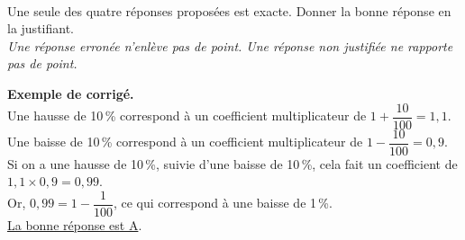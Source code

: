 \begin{activite}
   \ \\ [-16mm]
   \begin{QCM}
      Une seule des quatre réponses proposées est exacte. Donner la bonne réponse en la justifiant. \\
{\it Une réponse erronée n’enlève pas de point. Une réponse non justifiée ne rapporte pas de point.}
      \begin{center}
          \bigskip
      \end{center}
   \end{QCM}
   
   \bigskip
   
   \textcolor{G1}{
   {\bf Exemple de corrigé.} \\ \smallskip
      Une hausse de 10\,\% correspond à un coefficient multiplicateur de $1+\dfrac{10}{100} =1,1$. \\ [1mm]
      Une baisse de 10\,\% correspond à un coefficient multiplicateur de $1-\dfrac{10}{100} =0,9$. \\ [1mm]
      Si on a une hausse de 10\,\%, suivie d'une baisse de 10\,\%, cela fait un coefficient de $1,1\times0,9 =0,99$. \\ [1mm]
      Or, $0,99 =1-\dfrac1{100}$, ce qui correspond à une baisse de 1\,\%. \\ [1mm]
      \uline{La bonne réponse est A}.} \\ [10mm]
\end{activite}

\bigskip


